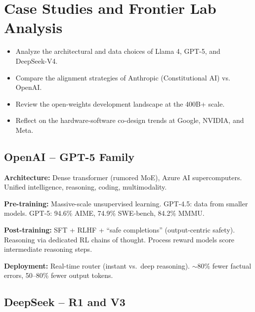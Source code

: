 \chapter{Case Studies and Frontier Lab Analysis}
\minitoc

\begin{chapteroverview}
  \begin{itemize}
    \item Analyze the architectural and data choices of Llama 4, GPT-5, and DeepSeek-V4.
    \item Compare the alignment strategies of Anthropic (Constitutional AI) vs. OpenAI.
    \item Review the open-weights development landscape at the 400B+ scale.
    \item Reflect on the hardware-software co-design trends at Google, NVIDIA, and Meta.
  \end{itemize}
\end{chapteroverview}

\section{OpenAI -- GPT-5 Family}

\begin{companybox}
\textbf{Architecture:} Dense transformer (rumored MoE), Azure AI supercomputers. Unified intelligence, reasoning, coding, multimodality.

\textbf{Pre-training:} Massive-scale unsupervised learning. GPT-4.5: data from smaller models. GPT-5: 94.6\% AIME, 74.9\% SWE-bench, 84.2\% MMMU.

\textbf{Post-training:} SFT + RLHF + ``safe completions'' (output-centric safety). Reasoning via dedicated RL chains of thought. Process reward models score intermediate reasoning steps.

\textbf{Deployment:} Real-time router (instant vs.\ deep reasoning). $\sim$80\% fewer factual errors, 50--80\% fewer output tokens.
\end{companybox}

\section{DeepSeek -- R1 and V3}

